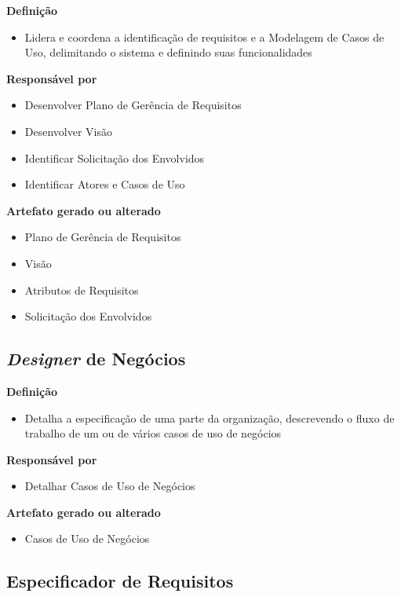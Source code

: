 \textbf{Definição}
\begin{itemize}
\item Lidera e coordena a identificação de requisitos e a Modelagem de Casos de Uso, delimitando o sistema e definindo suas funcionalidades
\end{itemize}

\textbf{Responsável por}
\begin{itemize}
\item Desenvolver Plano de Gerência de Requisitos
\item Desenvolver Visão
\item Identificar Solicitação dos Envolvidos
\item Identificar Atores e Casos de Uso
\end{itemize}

\textbf{Artefato gerado ou alterado}
\begin{itemize}
\item Plano de Gerência de Requisitos
\item Visão
\item Atributos de Requisitos
\item Solicitação dos Envolvidos
\end{itemize}

\subsection{\textit{Designer} de Negócios}

\textbf{Definição}
\begin{itemize}
\item Detalha a especificação de uma parte da organização, descrevendo o fluxo de trabalho de um ou de vários casos de uso de negócios
\end{itemize}

\textbf{Responsável por}
\begin{itemize}
\item Detalhar Casos de Uso de Negócios
\end{itemize}

\textbf{Artefato gerado ou alterado}
\begin{itemize}
\item Casos de Uso de Negócios
\end{itemize}

\subsection{Especificador de Requisitos}

